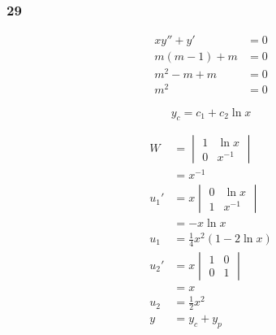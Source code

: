 \documentclass{article}
\begin{document}
\subsubsection{29}

\begin{align*}
  x y'' + y'    & = 0 \\
  m (m - 1) + m & = 0 \\
  m^2 - m + m   & = 0 \\
  m^2           & = 0
\end{align*}

\[y_c = c_1 + c_2 \ln x\]

\begin{align*}
  W                    & = \begin{vmatrix}
                             1 & \ln x  \\
                             0 & x^{-1}
                           \end{vmatrix}                                                          \\
                       & = x^{-1}                                                                  \\
  u_1'                 & = x \begin{vmatrix}
                               0 & \ln x  \\
                               1 & x^{-1}
                             \end{vmatrix}                                                        \\
                       & = -x \ln x                                                                \\
  u_1                  & = \frac{1}{4} x^2 (1 - 2 \ln x)                                           \\
  u_2'                 & = x \begin{vmatrix}
                               1 & 0 \\
                               0 & 1
                             \end{vmatrix}                                                        \\
                       & = x                                                                       \\
  u_2                  & = \frac{1}{2} x^2                                                         \\
  y                    & = y_c + y_p                                                               \\

\end{align*}
\end{document}
